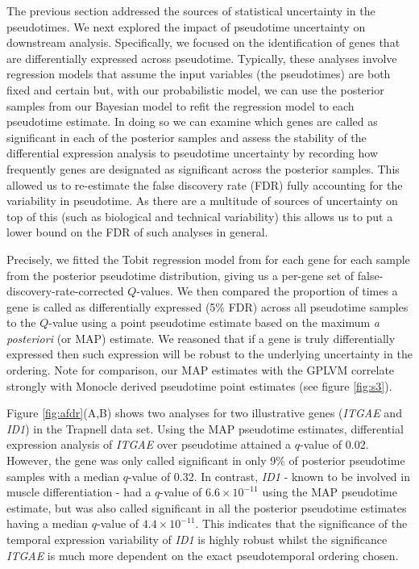 The previous section addressed the sources of statistical uncertainty in the pseudotimes. We next explored the impact of pseudotime uncertainty on downstream analysis. Specifically, we focused on the identification of genes that are differentially expressed across pseudotime. Typically, these analyses involve regression models that assume the input variables (the pseudotimes) are both fixed and certain but, with our probabilistic model, we can use the posterior samples from our Bayesian model to refit the regression model to each pseudotime estimate. In doing so we can examine which genes are called as significant in each of the posterior samples and assess the stability of the differential expression analysis to pseudotime uncertainty by recording how frequently genes are designated as significant across the posterior samples. This allowed us to re-estimate the false discovery rate (FDR)  fully accounting for the variability in pseudotime. As there are a multitude of sources of uncertainty on top of this (such as biological and technical variability) this allows us to put a lower bound on the FDR of such analyses in general.

Precisely, we fitted the Tobit regression model from \cite{Trapnell2014-xi} for each gene for each sample from the posterior pseudotime distribution, giving us a per-gene set of false-discovery-rate-corrected $Q$-values. We then compared the proportion of times a gene is called as differentially expressed (5\% FDR) across all pseudotime samples to the $Q$-value using a point pseudotime estimate based on the maximum \textit{a posteriori} (or MAP) estimate. We reasoned that if a gene is truly differentially expressed then such expression will be robust to the underlying uncertainty in the ordering. Note for comparison, our MAP estimates with the GPLVM correlate strongly with Monocle derived pseudotime point estimates (see figure \ref{fig:s3}).

Figure \ref{fig:afdr}(A,B) shows two analyses for two illustrative genes  (\emph{ITGAE} and \emph{ID1}) in the Trapnell data set. Using the MAP pseudotime estimates, differential expression analysis of \emph{ITGAE} over pseudotime attained a $q$-value of 0.02. However, the gene was only called significant in only 9\% of posterior pseudotime samples with a median $q$-value of 0.32. In contrast, \emph{ID1} - known to be involved in muscle differentiation - had a $q$-value of $6.6 \times 10^{-11}$ using the MAP pseudotime estimate, but was also called  significant in all the posterior pseudotime estimates having a median $q$-value of $4.4 \times 10^{-11}$. This indicates that the significance of the temporal expression variability of \emph{ID1} is highly robust whilst the significance \emph{ITGAE} is much more dependent on the exact pseudotemporal ordering chosen.

